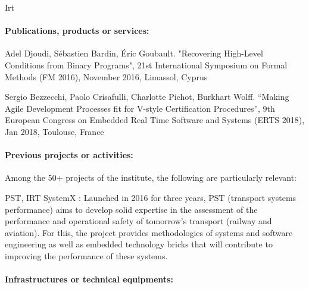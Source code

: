 \begin{sitedescription}{Irt}
\paragraph{Publications, products or services:}


\begin{compactitem}
\item Adel Djoudi, Sébastien Bardin, Éric Goubault. "Recovering High-Level Conditions from Binary Programs", 21st International Symposium on Formal Methods (FM 2016), November 2016, Limassol, Cyprus
\item Sergio Bezzecchi, Paolo Crisafulli, Charlotte Pichot, Burkhart Wolff. “Making Agile Development Processes fit for V-style Certification Procedures”, 9th European Congress on Embedded Real Time Software and Systems (ERTS 2018), Jan 2018, Toulouse, France
\end{compactitem}





\paragraph{Previous projects or activities:}


Among the 50+ projects of the institute, the following are particularly relevant:


\begin{compactitem}
\item PST, IRT SystemX : Launched in 2016 for three years, PST (transport systems performance) aims to develop solid expertise in the assessment of the performance and operational safety of tomorrow’s transport (railway and aviation). For this, the project provides methodologies of systems and software engineering as well as embedded technology bricks that will contribute to improving the performance of these systems.

\end{compactitem}






\paragraph{Infrastructures or technical equipments:}


\end{sitedescription}
